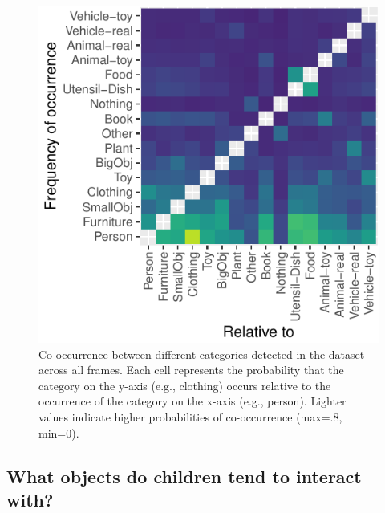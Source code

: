 \documentclass[10pt, letterpaper]{article}
\newenvironment{CodeChunk}{}{}
\begin{document}
\begin{CodeChunk}
\begin{figure}[h]

{\centering \includegraphics{figs/coocc_stats-1} 

}

\caption[Co-occurrence between different categories detected in the dataset across all frames]{Co-occurrence between different categories detected in the dataset across all frames. Each cell represents the probability that the category on the y-axis (e.g., clothing) occurs relative to the occurrence of the category on the x-axis (e.g., person). Lighter values indicate higher probabilities of co-occurrence (max=.8, min=0).}\label{fig:coocc_stats}
\end{figure}
\end{CodeChunk}

\hypertarget{what-objects-do-children-tend-to-interact-with}{%
\subsection{What objects do children tend to interact
with?}\label{what-objects-do-children-tend-to-interact-with}}
\end{document}
